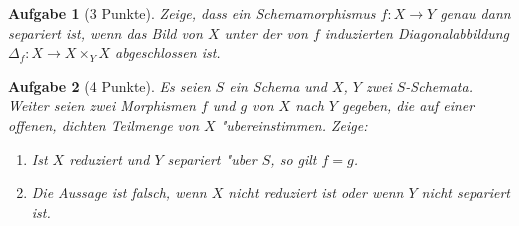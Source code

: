 \documentclass[paper = A4, fontsize=12pt, numbers=noendperiod, chapterprefix=true]{scrbook}
\theoremstyle{break}
\newtheorem{Aufg}{Aufgabe}
\theoremstyle{nonumberbreak}
\theoremstyle{nonumberplain}
\begin{document}
\begin{Aufg}[3 Punkte]
Zeige, dass ein Schemamorphismus $f\colon X \rightarrow Y$ genau dann separiert ist, wenn das Bild von $X$ unter der von $f$ induzierten Diagonalabbildung $\Delta_f\colon X \rightarrow X \times_Y X$ abgeschlossen ist.
\end{Aufg}

\begin{Aufg}[4 Punkte]
Es seien $S$ ein Schema und $X$, $Y$ zwei $S$-Schemata. Weiter seien zwei Morphismen $f$ und $g$ von $X$ nach $Y$ gegeben, die auf einer offenen, dichten Teilmenge von $X$ "ubereinstimmen. Zeige:
\begin{enumerate}%
 \item Ist $X$ reduziert und $Y$ separiert "uber $S$, so gilt $f = g$.
 \item Die Aussage ist falsch, wenn $X$ nicht reduziert ist oder wenn $Y$ nicht separiert ist.
 \end{enumerate}
 \end{Aufg}
\end{document}
